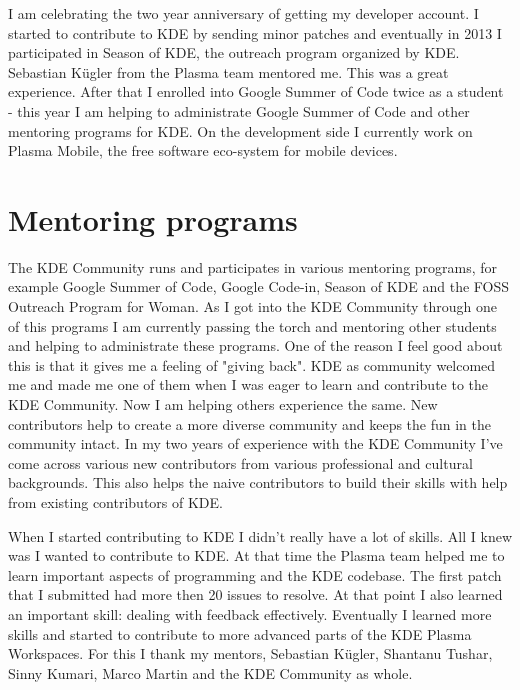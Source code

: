 

\noindent{}I am celebrating the two year anniversary of getting my developer account. I started to contribute to KDE by sending minor patches and eventually in 2013 I participated in Season of KDE, the outreach program organized by KDE. Sebastian K\"{u}gler from the Plasma team mentored me. This was a great experience. After that I enrolled into Google Summer of Code twice as a student - this year I am helping to administrate Google Summer of Code and other mentoring programs for KDE. On the development side I currently work on Plasma Mobile, the free software eco-system for mobile devices.

\section*{Mentoring programs} The KDE Community runs and participates in various mentoring programs, for example Google Summer of Code, Google Code-in, Season of KDE and the FOSS Outreach Program for Woman. As I got into the KDE Community through one of this programs I am currently passing the torch and mentoring other students and helping to administrate these programs. One of the reason I feel good about this is that it gives me a feeling of "giving back". KDE as community welcomed me and made me one of them when I was eager to learn and contribute to the KDE Community. Now I am helping others experience the same. New contributors help to create a more diverse community and keeps the fun in the community intact. In my two years of experience with the KDE Community I've come across various new contributors from various professional and cultural backgrounds. This also helps the naive contributors to build their skills with help from existing contributors of KDE.

When I started contributing to KDE I didn't really have a lot of skills. All I knew was I wanted to contribute to KDE. At that time the Plasma team helped me to learn important aspects of programming and the KDE codebase. The first patch that I submitted had more then 20 issues to resolve. At that point I also learned an important skill: dealing with feedback effectively. Eventually I learned more skills and started to contribute to more advanced parts of the KDE Plasma Workspaces. For this I thank my mentors, Sebastian K\"{u}gler, Shantanu Tushar, Sinny Kumari, Marco Martin and the KDE Community as whole.

